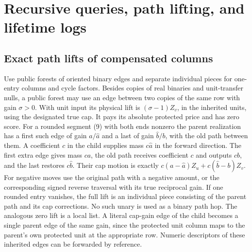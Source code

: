 \documentclass[11pt]{article}
\begin{document}
\hypertarget{recursive-queries-path-lifting-and-lifetime-logs}{%
\section{Recursive queries, path lifting, and lifetime logs}\label{recursive-queries-path-lifting-and-lifetime-logs}}

\hypertarget{exact-path-lifts-of-compensated-columns}{%
\subsection{Exact path lifts of compensated columns}\label{exact-path-lifts-of-compensated-columns}}

Use public forests of oriented binary edges and separate individual pieces for one-entry columns and cycle factors. Besides copies of real binaries and unit-transfer nulls, a public forest may use an edge between two copies of the same row with gain \(\sigma>0\). With unit input its physical lift is \((\sigma-1)Z_v\), in the inherited units, using the designated true cap. It pays its absolute protected price and has zero score. For a rounded segment (9) with both ends nonzero the parent realization has a first such edge of gain \(a/\widehat a\) and a last of gain \(\widehat b/b\), with the old path between them. A coefficient \(c\) in the child supplies mass \(c\widehat a\) in the forward direction. The first extra edge gives mass \(ca\), the old path receives coefficient \(c\) and outputs \(cb\), and the last restores \(c\widehat b\). Their cap motion is exactly \(c(a-\widehat a)Z_u+c(\widehat b-b)Z_v\). For negative moves use the original path with a negative amount, or the corresponding signed reverse traversal with its true reciprocal gain. If one rounded entry vanishes, the full lift is an individual piece consisting of the parent path and its cap corrections. No such unary is used as a binary path hop. The analogous zero lift is a local list. A literal cap-gain edge of the child becomes a single parent edge of the same gain, since the protected unit column maps to the parent's own protected unit at the appropriate row. Numeric descriptors of these inherited edges can be forwarded by reference.
\end{document}
